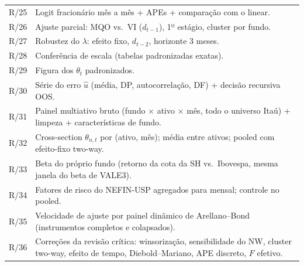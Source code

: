 \documentclass[11pt,a4paper]{article}
\begin{document}
\begin{center}
\begin{tabular}{@{}lp{11.6cm}@{}}
R/25 & Logit fracionário mês a mês + APEs + comparação com o linear. \\
R/26 & Ajuste parcial: MQO vs.\ VI ($d_{t-1}$), 1º estágio, cluster por fundo. \\
R/27 & Robustez do $\lambda$: efeito fixo, $d_{t-2}$, horizonte 3 meses. \\
R/28 & Conferência de escala (tabelas padronizadas exatas). \\
R/29 & Figura dos $\theta_t$ padronizados. \\
R/30 & Série do erro $\widehat u$ (média, DP, autocorrelação, DF) + decisão recursiva OOS. \\
R/31 & Painel multiativo bruto (fundo $\times$ ativo $\times$ mês, todo o universo Itaú) + limpeza + características de fundo. \\
R/32 & Cross-section $\theta_{n,t}$ por (ativo, mês); média entre ativos; pooled com efeito-fixo two-way. \\
R/33 & Beta do próprio fundo (retorno da cota da SH vs.\ Ibovespa, mesma janela do beta de VALE3). \\
R/34 & Fatores de risco do NEFIN-USP agregados para mensal; controle no pooled. \\
R/35 & Velocidade de ajuste por painel dinâmico de Arellano--Bond (instrumentos completos e colapsados). \\
R/36 & Correções da revisão crítica: winsorização, sensibilidade do NW, cluster two-way, efeito de tempo, Diebold--Mariano, APE discreto, $F$ efetivo. \\
\bottomrule
\end{tabular}
\end{center}
\end{document}
